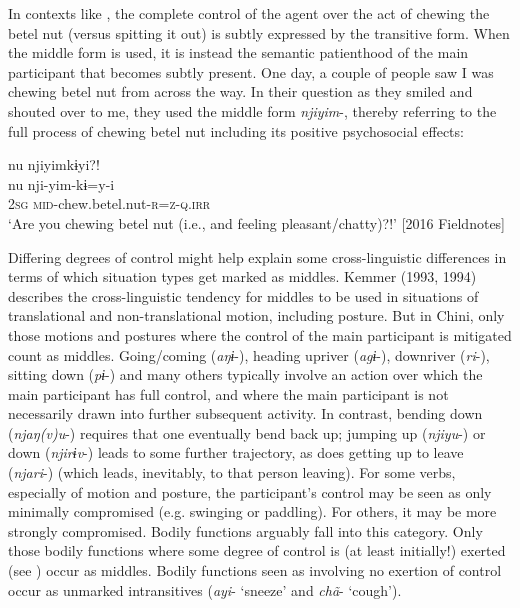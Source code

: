\documentclass[output=paper]{langscibook}
\begin{document}
In contexts like , the complete control of the agent over the act of chewing the betel nut (versus spitting it out) is subtly expressed by the transitive form. When the middle form is used, it is instead the semantic patienthood of the main participant that becomes subtly present. One day, a couple of people saw I was chewing betel nut from across the way. In their question as they smiled and shouted over to me, they used the middle form \textit{njiyim}-, thereby referring to the full process of chewing betel nut including its positive psychosocial effects:

\ea\label{ex:brooks:33}
\glll nu  njiyimkɨyi?!\\
 nu nji-yim-kɨ=y-i\\
 \textsc{2sg}  \textsc{mid}-chew.betel.nut-\textsc{r=z-q.irr}\\
 \glt `Are you chewing betel nut (i.e., and feeling pleasant/chatty)?!' [2016 Fieldnotes]
 \z

 Differing degrees of control might help explain some cross-linguistic differences in terms of which situation types get marked as middles. Kemmer (1993, 1994) describes the cross-linguistic tendency for middles to be used in situations of translational and non-translational motion, including posture. But in Chini, only those motions and postures where the control of the main participant is mitigated count as middles. Going/coming (\textit{aŋɨ}-), heading upriver (\textit{agɨ}-), downriver (\textit{ri}-), sitting down (\textit{pɨ}-) and many others typically involve an action over which the main participant has full control, and where the main participant is not necessarily drawn into further subsequent activity. In contrast, bending down (\textit{njaŋ(v)u}-) requires that one eventually bend back up; jumping up (\textit{njiyu}-) or down (\textit{njirɨv}-) leads to some further trajectory, as does getting up to leave (\textit{njari}-) (which leads, inevitably, to that person leaving). For some verbs, especially of motion and posture, the participant's control may be seen as only minimally compromised (e.g. swinging or paddling). For others, it may be more strongly compromised. Bodily functions arguably fall into this category. Only those bodily functions where some degree of control is (at least initially!) exerted (see ) occur as middles. Bodily functions seen as involving no exertion of control occur as unmarked intransitives (\textit{ayi}- ‘sneeze’ and \textit{chã}- ‘cough’).

\label{sec:brooks:4.2.1.3.2}
\end{document}
